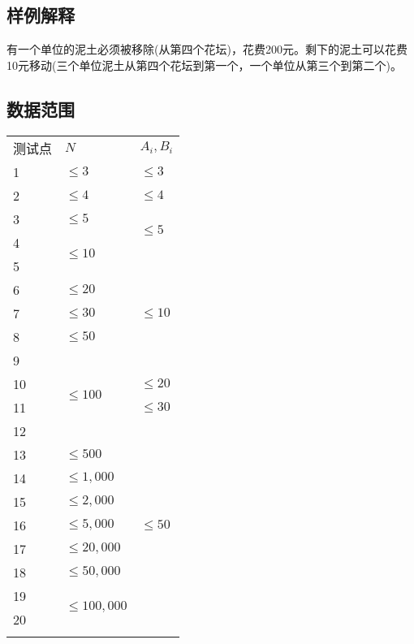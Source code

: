 \documentclass[hyperref,UTF8,12pt,a4paper]{ctexart}
\begin{document}
\subsection{样例解释}

有一个单位的泥土必须被移除(从第四个花坛)，花费200元。剩下的泥土可以花费10元移动(三个单位泥土从第四个花坛到第一个，一个单位从第三个到第二个)。

\subsection{数据范围}

\begin{center}
\begin{tabular}{P{50pt}|P{180pt}|P{180pt}}
\Xhline{3\arrayrulewidth}
测试点 & $N$ & $A_i,B_i$\\
\Xhline{2\arrayrulewidth}
1 & $\le3$ & $\le3$ \\
 & $\le4$ & $\le4$ \\
 & $\le5$ &  \\
4 &  & \\
5 & &  \\
6 & $\le20$ & \\
7 & $\le30$ & \\
8 & $\le50$ & \\
9 &  & \\
10 & & $\le20$ \\
11 & & $\le30$ \\
12 & &  \\
13 & $\le500$ & \\
14 & $\le1,000$ & \\
15 & $\le2,000$ & \\
16 & $\le5,000$ & \\
17 & $\le20,000$ & \\
18 & $\le50,000$ & \\
19 &  & \\
20 & & \\
\Xhline{3\arrayrulewidth}
\end{tabular}
\end{center}
\end{document}
